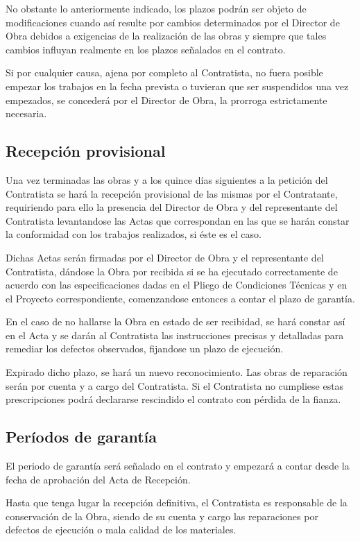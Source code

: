 No obstante lo anteriormente indicado, los plazos podrán ser objeto de modificaciones cuando así resulte por cambios determinados por el Director de Obra debidos a exigencias de la realización de las obras y siempre que tales cambios influyan realmente en los plazos señalados en el contrato.   

Si por cualquier causa, ajena por completo al Contratista, no fuera posible empezar los trabajos en la fecha prevista o tuvieran que ser suspendidos una  vez empezados, se concederá por el Director de Obra, la prorroga estrictamente necesaria.  
\subsection{Recepción provisional}
\label{subsec:pliego-recepcionprovisionalOrg}
Una vez terminadas las obras y a los quince días siguientes a la petición del Contratista se hará la recepción provisional de las mismas por el Contratante, requiriendo para ello la presencia del Director de Obra y del representante del Contratista levantandose las Actas que correspondan en las que se harán constar la conformidad con los trabajos realizados, si éste es el caso.

Dichas Actas serán firmadas por el Director de Obra y el representante del Contratista, dándose la Obra por recibida si se ha ejecutado correctamente de acuerdo con las especificaciones dadas en el Pliego de Condiciones Técnicas y en el Proyecto correspondiente, comenzandose entonces a contar el plazo de garantía.

En el caso de no hallarse la Obra en estado de ser recibidad,  se hará constar  así en el Acta y  se darán al Contratista las instrucciones precisas y detalladas para remediar los defectos observados, fijandose un plazo de ejecución.

Expirado dicho plazo, se hará un nuevo reconocimiento.  Las obras de reparación  serán por cuenta y a cargo del Contratista.  
Si el Contratista no cumpliese estas prescripciones podrá declararse rescindido  el contrato con pérdida de la fianza.  
\subsection{Períodos de garantía}
\label{subsec:pliego-garantiaOrg}
El periodo de garantía será señalado en el contrato y empezará a contar desde la fecha de aprobación del Acta de Recepción. 

Hasta que tenga lugar la recepción definitiva, el Contratista es responsable de la conservación de la Obra, siendo de su cuenta y cargo las reparaciones por defectos de ejecución o mala calidad de los materiales.

